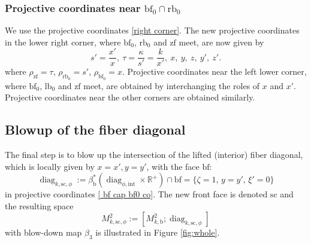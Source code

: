 \documentclass[JEP,XML,SOM,Unicode,NoFloatCountersInSection,published]{cedram}
\newcommand{\intt}{\mathrm{int}}
\theoremstyle{plain}
\theoremstyle{definition}
\newcommand{\R}{{\mathbb{R}}}
\newcommand{\bb}{{\mathrm{b}}}
\newcommand{\lfz}{{\mathrm{lb}_0}}
\newcommand{\rfz}{{\mathrm{rb}_0}}
\newcommand{\bbf}{{\mathrm{bf}}}
\newcommand{\bfz}{{\bbf_0}}
\newcommand{\ssc}{{\mathrm{sc}}}
\newcommand{\zf}{{\mathrm{zf}}}
\DeclareMathOperator\diag{diag}
\begin{document}
\subsubsection*{Projective coordinates near $\bfz \cap \rfz$}
We use the projective coordinates \eqref{right corner}. The new projective
coordinates in the lower right corner, where $\bfz$, $\rfz$ and $\zf$ meet, are now given by
\begin{equation}
s' = \frac{x'}{x}, \ \tau = \frac{\kappa}{s'} = \frac{k}{x'}, \ x, \ y, \ z, \ y', \ z'.
\end{equation}
where $\rho_{\zf} = \tau$, $\rho_{\rfz} = s'$, $\rho_{\bfz} = x$. Projective
coordinates near the left lower corner, where $\bfz$, $\lfz$ and $\zf$ meet,
are obtained by interchanging the roles of $x$ and $x'$. Projective coordinates near the other
corners are obtained similarly.

\subsection{Blowup of the fiber diagonal} \label{subsec:bup fiber diag}
The final step is to blow up the intersection of the lifted (interior) fiber diagonal, which is locally given by $x=x',y=y'$, with the face $\bbf$:
\begin{equation}
\label{eqn:def diag k sc phi}
\diag_{k,\ssc,\phi} := \beta_\bb^*(\diag_{\phi,\intt}\times\R^+) \cap \bbf = \{\zeta=1, \, y = y', \, \xi'=0\}
\end{equation}
in projective coordinates
\eqref{ bf cap bf0 co}.
The new front face is denoted $\ssc$ and the resulting space
\[
M^{2}_{k, \ssc,\phi}:= [M^{2}_{k,\bb} ; \diag_{k,\ssc,\phi}]
\]
with blow-down map $\beta_3$
is illustrated in Figure \ref{fig:whole}.
\end{document}
